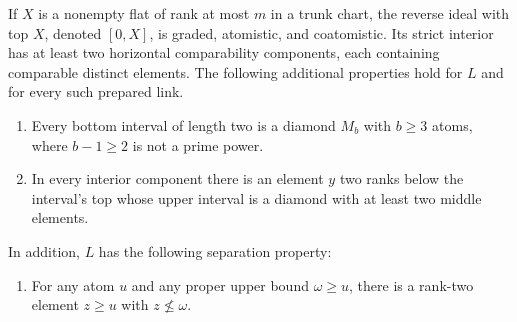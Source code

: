 \begin{proposition}\label{f:prop-prepared-links}
If $X$ is a nonempty flat of rank at most $m$ in a trunk chart, the reverse
ideal with top $X$, denoted $[0,X]$, is graded, atomistic, and coatomistic.
Its strict interior has at least two horizontal comparability components,
each containing comparable distinct elements. The following additional
properties hold for $L$ and for every such prepared link.
\begin{enumerate}[label=\textup{(\roman*)}]
\item\label{f:link-diamonds} Every bottom interval of length two is a diamond
$M_b$ with $b\ge3$ atoms, where $b-1\ge2$ is not a prime power.
\item\label{f:link-upper-diamonds} In every interior component there is an
element $y$ two ranks below the interval's top whose upper interval is a
diamond with at least two middle elements.
\end{enumerate}
In addition, $L$ has the following separation property:
\begin{enumerate}[label=\textup{(\roman*)},resume]
\item\label{f:link-separation} For any atom $u$ and any proper upper bound
$\omega\ge u$, there is a rank-two element $z\ge u$ with
$z\not\le\omega$.
\end{enumerate}
\end{proposition}
